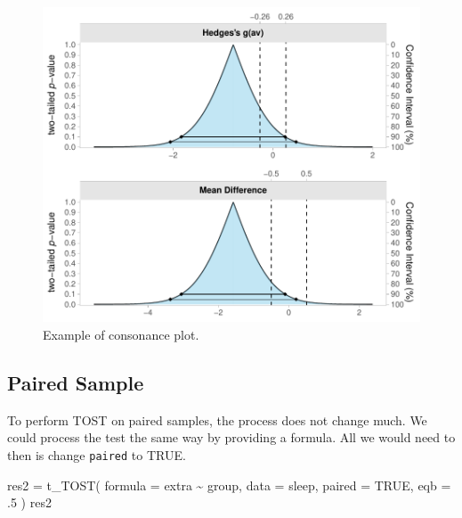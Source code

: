 \documentclass[
]{interact}
\newenvironment{Shaded}{\begin{snugshade}}{\end{snugshade}}
\newcommand{\AttributeTok}[1]{\textcolor[rgb]{0.40,0.45,0.13}{#1}}
\newcommand{\ConstantTok}[1]{\textcolor[rgb]{0.56,0.35,0.01}{#1}}
\newcommand{\DecValTok}[1]{\textcolor[rgb]{0.68,0.00,0.00}{#1}}
\newcommand{\FunctionTok}[1]{\textcolor[rgb]{0.28,0.35,0.67}{#1}}
\newcommand{\NormalTok}[1]{\textcolor[rgb]{0.00,0.23,0.31}{#1}}
\newcommand{\OtherTok}[1]{\textcolor[rgb]{0.00,0.23,0.31}{#1}}
\newcommand{\SpecialCharTok}[1]{\textcolor[rgb]{0.37,0.37,0.37}{#1}}
\begin{document}
\begin{figure}[H]

{\centering \includegraphics{avocado-quarto_files/figure-pdf/conplot-1.pdf}

}

\caption{Example of consonance plot.}

\end{figure}

\newpage

\hypertarget{paired-sample}{%
\subsection{Paired Sample}\label{paired-sample}}

To perform TOST on paired samples, the process does not change much. We
could process the test the same way by providing a formula. All we would
need to then is change \texttt{paired} to TRUE.

\begin{Shaded}
\begin{Highlighting}[]
\NormalTok{res2 }\OtherTok{=} \FunctionTok{t\_TOST}\NormalTok{(}
  \AttributeTok{formula =}\NormalTok{ extra }\SpecialCharTok{\textasciitilde{}}\NormalTok{ group,}
  \AttributeTok{data =}\NormalTok{ sleep,}
  \AttributeTok{paired =} \ConstantTok{TRUE}\NormalTok{,}
  \AttributeTok{eqb =}\NormalTok{ .}\DecValTok{5}
\NormalTok{)}
\NormalTok{res2}
\end{Highlighting}
\end{Shaded}
\end{document}

